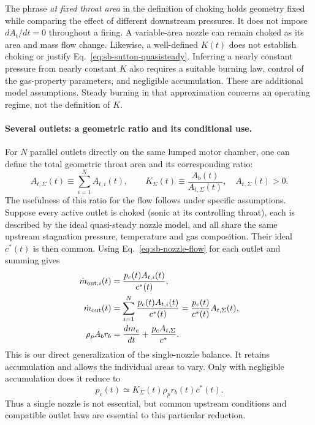 The phrase \emph{at fixed throat area} in the definition of choking
holds geometry fixed while comparing the effect of different downstream
pressures. It does not impose $dA_t/dt=0$ throughout a firing. A
variable-area nozzle can remain choked as its area and mass flow change.
Likewise, a well-defined $K(t)$ does not establish choking or justify
Eq.~\eqref{eq:sb-sutton-quasisteady}.
Inferring a nearly constant pressure from nearly constant $K$ also
requires a suitable burning law, control of the gas-property parameters,
and negligible accumulation. These are additional model assumptions.
Steady burning in that approximation concerns an operating regime,
not the definition of $K$.

\paragraph{Several outlets: a geometric ratio and its conditional use.}
For $N$ parallel outlets directly on the same lumped motor chamber,
one can define the total geometric throat area and its corresponding
ratio:
\begin{equation}\label{eq:sb-k-multiple}
 A_{t,\Sigma}(t)\equiv\sum_{i=1}^{N}A_{t,i}(t),\qquad
 K_\Sigma(t)\equiv\frac{A_b(t)}{A_{t,\Sigma}(t)},
 \quad A_{t,\Sigma}(t)>0.
\end{equation}
The usefulness of this ratio for the flow follows under specific
assumptions. Suppose every active outlet is choked (sonic at its
controlling throat), each is described by the ideal quasi-steady
nozzle model, and all share the same upstream stagnation pressure,
temperature and gas composition. Their ideal $c^*(t)$ is then common.
Using Eq.~\eqref{eq:sb-nozzle-flow} for each outlet and summing gives
\begin{align}
 \dot m_{\mathrm{out},i}(t)
 &=\frac{p_c(t)A_{t,i}(t)}{c^*(t)},\notag\\
 \dot m_{\mathrm{out}}(t)
 &=\sum_{i=1}^{N}\frac{p_c(t)A_{t,i}(t)}{c^*(t)}
  =\frac{p_c(t)}{c^*(t)}A_{t,\Sigma}(t),\notag\\
 \rho_pA_b r_b
 &=\frac{dm_c}{dt}+\frac{p_cA_{t,\Sigma}}{c^*}.
 \label{eq:sb-multiple-choked-balance}
\end{align}
This is our direct generalization of the single-nozzle balance.
It retains accumulation and allows the individual areas to vary.
Only with negligible accumulation does it reduce to
\[
 p_c(t)\simeq K_\Sigma(t)\rho_p r_b(t)c^*(t).
\]
Thus a single nozzle is not essential, but common upstream conditions
and compatible outlet laws are essential to this particular reduction.

